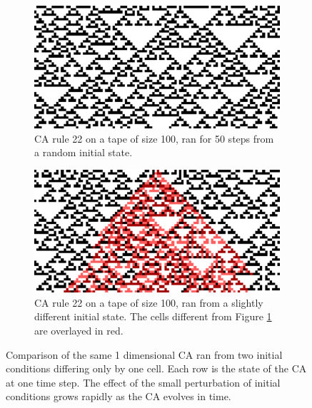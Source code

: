 \begin{figure}[htbp]
  \centering
  \begin{subfigure}[t]{.47\linewidth}
    \centering
    \includegraphics[width=.93\linewidth]{figures/ca_comp_a}
    \caption{\ac{CA} rule 22 on a tape of size 100, ran for 50 steps from a
      random initial state.}
    \label{fig:ca_comp_a}
  \end{subfigure}
  \hspace{10pt}
  \begin{subfigure}[t]{.47\linewidth}
    \centering
    \includegraphics[width=.93\linewidth]{figures/ca_comp_b}
    \caption{\ac{CA} rule 22 on a tape of size 100, ran from a slightly
      different initial state. The cells different from Figure \ref{fig:ca_comp_a} are
      overlayed in red.}
    \label{fig:ca_comp_b}
  \end{subfigure}

  \caption{Comparison of the same 1 dimensional \ac{CA} ran from two initial conditions
    differing only by one cell. Each row is the state of the \ac{CA} at one time
    step. The effect of the small perturbation of initial conditions grows
    rapidly as the \ac{CA} evolves in time.}
  \label{fig:ca_comp}
\end{figure}


